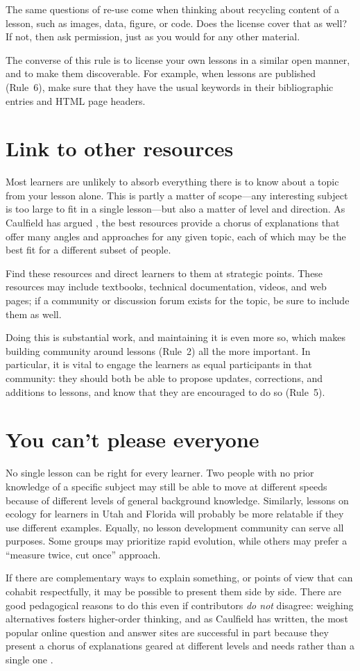 \documentclass[10pt,letterpaper]{article}
\newcommand{\rulemajor}[1]{\section{#1}}
\begin{document}
The same questions of re-use come when thinking about recycling content of a lesson,
such as images, data, figure, or code.
Does the license cover that as well?
If not,
then ask permission,
just as you would for any other material.

The converse of this rule is to license your own lessons in a similar open manner,
and to make them discoverable.
For example,
when lessons are published (Rule~6),
make sure that they have the usual keywords in their bibliographic entries
and HTML page headers.

\rulemajor{Link to other resources}

Most learners are unlikely to absorb everything there is to know about a topic
from your lesson alone.
This is partly a matter of scope---any interesting subject is too large
to fit in a single lesson---but also a matter of level and direction.
As Caulfield has argued \cite{choral-explanations},
the best resources provide a chorus of explanations
that offer many angles and approaches for any given topic,
each of which may be the best fit for a different subset of people.

Find these resources and direct learners to them at strategic points.
These resources may include textbooks,
technical documentation,
videos,
and web pages;
if a community or discussion forum exists for the topic,
be sure to include them as well.

Doing this is substantial work,
and maintaining it is even more so,
which makes building community around lessons (Rule~2) all the more important.
In particular,
it is vital to engage the learners as equal participants in that community:
they should both be able to propose updates, corrections, and additions to lessons,
and know that they are encouraged to do so (Rule~5).

\rulemajor{You can't please everyone}

No single lesson can be right for every learner.
Two people with no prior knowledge of a specific subject
may still be able to move at different speeds
because of different levels of general background knowledge.
Similarly,
lessons on ecology for learners in Utah and Florida
will probably be more relatable if they use different examples.
Equally,
no lesson development community can serve all purposes.
Some groups may prioritize rapid evolution,
while others may prefer a ``measure twice, cut once'' approach.

If there are complementary ways to explain something,
or points of view that can cohabit respectfully,
it may be possible to present them side by side.
There are good pedagogical reasons to do this
even if contributors \emph{do not} disagree:
weighing alternatives fosters higher-order thinking,
and as Caulfield has written,
the most popular online question and answer sites
are successful in part because they present a chorus of explanations
geared at different levels and needs
rather than a single one \cite{choral-explanations}.
\end{document}
